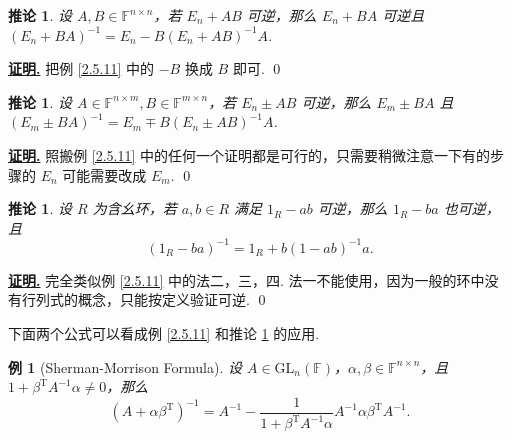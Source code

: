 \documentclass[10pt,openany]{article}
\theoremstyle{thmstyle} %
\theoremstyle{defstyle} %
\newtheorem{corollary}[theorem]{推论}
\theoremstyle{prostyle} %
\theoremstyle{exastyle}
\newtheorem{example}[theorem]{例}
\theoremstyle{remstyle}
\renewenvironment{proof}[1][证明]{\par\underline{\textbf{#1.}} \;\fangsong}{\qed\par}
\newcommand{\T}{^{\text{T}}}
\newcommand{\F}{\mathbb{F}}
\newcommand{\gfn}{\text{GL}_n(\mathbb{F})}
\newcommand{\n}{^{n \times n}}
\newcommand{\mn}{^{m \times n}}
\newcommand{\nm}{^{n \times m}}
\begin{document}
\begin{corollary}
	设 \( A,B \in \F\n \)，若 \( E_n+AB \) 可逆，那么 \( E_n+BA \) 可逆且 \( (E_n+BA)^{-1}=E_n-B(E_n+AB)^{-1}A \).
\end{corollary}

\begin{proof}
	把例 \ref{2.5.11} 中的 \( -B \) 换成 \( B \) 即可.
\end{proof}

\begin{corollary} \label{2.5.13}
	设 \( A \in \F\nm, B \in \F\mn \)，若 \( E_n \pm AB \) 可逆，那么 \( E_m \pm BA \) 且 \( (E_m \pm BA)^{-1}=E_m \mp B(E_n \pm AB)^{-1}A \).
\end{corollary}

\begin{proof}
	照搬例 \ref{2.5.11} 中的任何一个证明都是可行的，只需要稍微注意一下有的步骤的 \( E_n \) 可能需要改成 \( E_m\). 
\end{proof}

\begin{corollary}
	设 \( R \) 为含幺环，若 \( a,b \in R \) 满足 \( 1_R -ab \) 可逆，那么 \( 1_R-ba \) 也可逆，且 
	\[ (1_R-ba)^{-1}=1_R+b(1-ab)^{-1}a. \]
\end{corollary}

\begin{proof}
	完全类似例 \ref{2.5.11} 中的法二，三，四. 法一不能使用，因为一般的环中没有行列式的概念，只能按定义验证可逆.
\end{proof}

下面两个公式可以看成例 \ref{2.5.11} 和推论 \ref{2.5.13} 的应用.

\begin{example}[Sherman-Morrison Formula] \label{2.5.15}
	设 \( A  \in \gfn \)，\( \alpha, \beta \in \F\n \)，且 \( 1 + \beta\T A^{-1} \alpha \neq 0 \)，那么
	\[
	(A + \alpha \beta\T)^{-1} = A^{-1} - \frac{1}{1 + \beta\T A^{-1} \alpha} A^{-1} \alpha \beta\T A^{-1}.
	\]
\end{example}
\end{document}
